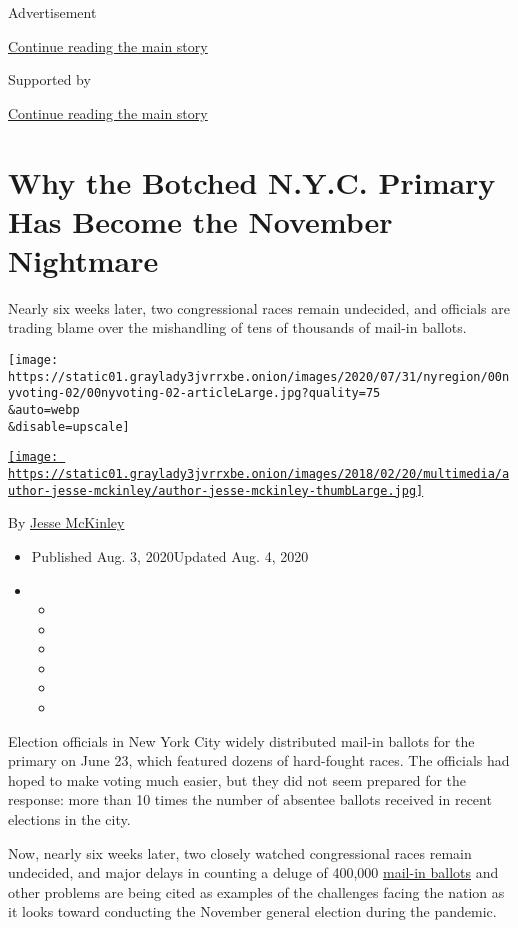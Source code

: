 Advertisement

\protect\hyperlink{after-top}{Continue reading the main story}

Supported by

\protect\hyperlink{after-sponsor}{Continue reading the main story}

\hypertarget{why-the-botched-nyc-primary-has-become-the-november-nightmare}{%
\section{Why the Botched N.Y.C. Primary Has Become the November
Nightmare}\label{why-the-botched-nyc-primary-has-become-the-november-nightmare}}

Nearly six weeks later, two congressional races remain undecided, and
officials are trading blame over the mishandling of tens of thousands of
mail-in ballots.

\texttt{[image: https://static01.graylady3jvrrxbe.onion/images/2020/07/31/nyregion/00nyvoting-02/00nyvoting-02-articleLarge.jpg?quality=75\\\&auto=webp\\\&disable=upscale]}

\href{https://www.nytimes3xbfgragh.onion/by/jesse-mckinley}{\texttt{[image: https://static01.graylady3jvrrxbe.onion/images/2018/02/20/multimedia/author-jesse-mckinley/author-jesse-mckinley-thumbLarge.jpg]}}

By \href{https://www.nytimes3xbfgragh.onion/by/jesse-mckinley}{Jesse
McKinley}

\begin{itemize}
\item
  Published Aug. 3, 2020Updated Aug. 4, 2020
\item
  \begin{itemize}
  \item
  \item
  \item
  \item
  \item
  \item
  \end{itemize}
\end{itemize}

Election officials in New York City widely distributed mail-in ballots
for the primary on June 23, which featured dozens of hard-fought races.
The officials had hoped to make voting much easier, but they did not
seem prepared for the response: more than 10 times the number of
absentee ballots received in recent elections in the city.

Now, nearly six weeks later, two closely watched congressional races
remain undecided, and major delays in counting a deluge of 400,000
\href{https://www.nytimes3xbfgragh.onion/2020/08/03/us/politics/trump-mail-in-voting.html}{mail-in
ballots} and other problems are being cited as examples of the
challenges facing the nation as it looks toward conducting the November
general election during the pandemic.

